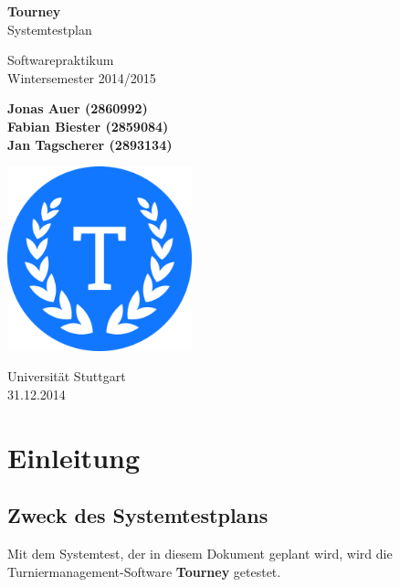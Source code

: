 \documentclass[11pt]{article}
\begin{document}
\begin{titlepage}
	\begin{center}
		\vspace*{1cm}

		\Huge
		\textbf{Tourney}\\
		Systemtestplan

		\vspace{0.5cm}
		\LARGE
		Softwarepraktikum\\
		\Large
		Wintersemester 2014/2015

		\vspace{1.5cm}

		\large
		\textbf{Jonas Auer (2860992)\\
				 Fabian Biester (2859084)\\
				 Jan Tagscherer (2893134)}

		\vfill

		\includegraphics[width=0.4\textwidth]{../Logo.png}

		\vspace{1.5cm}

		\Large
		Universität Stuttgart\\
		31.12.2014
	\end{center}
\end{titlepage}

\newpage

\tableofcontents
\newpage

\section{Einleitung}

\subsection{Zweck des Systemtestplans}

Mit dem Systemtest, der in diesem Dokument geplant wird, wird die Turniermanagement-Software \textbf{Tourney} getestet.
\end{document}
